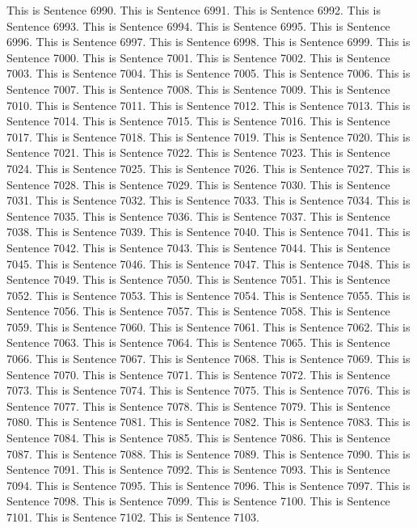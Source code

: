\documentclass{article}
\begin{document}
This is Sentence 6990.
This is Sentence 6991.
This is Sentence 6992.
This is Sentence 6993.
This is Sentence 6994.
This is Sentence 6995.
This is Sentence 6996.
This is Sentence 6997.
This is Sentence 6998.
This is Sentence 6999.
This is Sentence 7000.
This is Sentence 7001.
This is Sentence 7002.
This is Sentence 7003.
This is Sentence 7004.
This is Sentence 7005.
This is Sentence 7006.
This is Sentence 7007.
This is Sentence 7008.
This is Sentence 7009.
This is Sentence 7010.
This is Sentence 7011.
This is Sentence 7012.
This is Sentence 7013.
This is Sentence 7014.
This is Sentence 7015.
This is Sentence 7016.
This is Sentence 7017.
This is Sentence 7018.
This is Sentence 7019.
This is Sentence 7020.
This is Sentence 7021.
This is Sentence 7022.
This is Sentence 7023.
This is Sentence 7024.
This is Sentence 7025.
This is Sentence 7026.
This is Sentence 7027.
This is Sentence 7028.
This is Sentence 7029.
This is Sentence 7030.
This is Sentence 7031.
This is Sentence 7032.
This is Sentence 7033.
This is Sentence 7034.
This is Sentence 7035.
This is Sentence 7036.
This is Sentence 7037.
This is Sentence 7038.
This is Sentence 7039.
This is Sentence 7040.
This is Sentence 7041.
This is Sentence 7042.
This is Sentence 7043.
This is Sentence 7044.
This is Sentence 7045.
This is Sentence 7046.
This is Sentence 7047.
This is Sentence 7048.
This is Sentence 7049.
This is Sentence 7050.
This is Sentence 7051.
This is Sentence 7052.
This is Sentence 7053.
This is Sentence 7054.
This is Sentence 7055.
This is Sentence 7056.
This is Sentence 7057.
This is Sentence 7058.
This is Sentence 7059.
This is Sentence 7060.
This is Sentence 7061.
This is Sentence 7062.
This is Sentence 7063.
This is Sentence 7064.
This is Sentence 7065.
This is Sentence 7066.
This is Sentence 7067.
This is Sentence 7068.
This is Sentence 7069.
This is Sentence 7070.
This is Sentence 7071.
This is Sentence 7072.
This is Sentence 7073.
This is Sentence 7074.
This is Sentence 7075.
This is Sentence 7076.
This is Sentence 7077.
This is Sentence 7078.
This is Sentence 7079.
This is Sentence 7080.
This is Sentence 7081.
This is Sentence 7082.
This is Sentence 7083.
This is Sentence 7084.
This is Sentence 7085.
This is Sentence 7086.
This is Sentence 7087.
This is Sentence 7088.
This is Sentence 7089.
This is Sentence 7090.
This is Sentence 7091.
This is Sentence 7092.
This is Sentence 7093.
This is Sentence 7094.
This is Sentence 7095.
This is Sentence 7096.
This is Sentence 7097.
This is Sentence 7098.
This is Sentence 7099.
This is Sentence 7100.
This is Sentence 7101.
This is Sentence 7102.
This is Sentence 7103.
\end{document}
